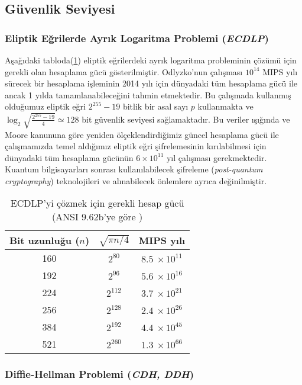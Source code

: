 \documentclass[a4paper,11pt]{article}
\begin{document}
\subsection{Güvenlik Seviyesi}



\subsubsection{Eliptik Eğrilerde Ayrık Logaritma Problemi (\emph{ECDLP})}

Aşağıdaki tabloda(\ref{table:1}) eliptik eğrilerdeki ayrık logaritma probleminin çözümü için gerekli olan hesaplama gücü gösterilmiştir.
Odlyzko'nun çalışması\cite{odlyzko} $10^{14}$ MIPS yılı sürecek bir hesaplama işleminin 2014 yılı için dünyadaki tüm hesaplama gücü ile ancak 1 yılda tamamlanabileceğini tahmin etmektedir. Bu çalışmada kullanmış olduğumuz eliptik eğri $2^{255}-19$ bitlik bir asal sayı $p$ kullanmakta ve $\log_{2}\sqrt{\frac{2^{255} - 19}{4}} \simeq 128$ bit güvenlik seviyesi sağlamaktadır. Bu veriler ışığında ve Moore kanununa göre yeniden ölçeklendirdiğimiz güncel hesaplama gücü ile çalışmamızda temel aldığımız eliptik eğri şifrelemesinin kırılabilmesi için dünyadaki tüm hesaplama gücünün $6 \times 10^{11}$ yıl çalışması gerekmektedir. Kuantum bilgisayarları sonrası kullanılabilecek şifreleme (\emph{post-quantum cryptography}) teknolojileri ve alınabilecek önlemlere ayrıca değinilmiştir.
 
\begin{table}[h!]
\centering
\renewcommand*\arraystretch{1.25}
\begin{tabular}{|c|c|c|}
\hline
Bit uzunluğu ($n$) & $\sqrt{\pi n\slash 4}$ & MIPS yılı \\
\hline\hline
160 & $2^{80}$ & $8.5\ \times 10^{11}$ \\ \hline
192 & $2^{96}$ & $5.6\ \times 10^{16}$ \\ \hline
224 & $2^{112}$ & $3.7\ \times 10^{21}$ \\ \hline
256 & $2^{128}$ & $2.4\ \times 10^{26}$ \\ \hline
384 & $2^{192}$ & $4.4\ \times 10^{45}$ \\ \hline
521 & $2^{260}$ & $1.3\ \times 10^{66}$ \\
 \hline
\end{tabular}
\caption{ECDLP'yi çözmek için gerekli hesap gücü (ANSI 9.62b'ye göre \cite{x9.62})}
\label{table:1}
\end{table}

\subsubsection{Diffie-Hellman Problemi (\emph{CDH, DDH})}
\end{document}
